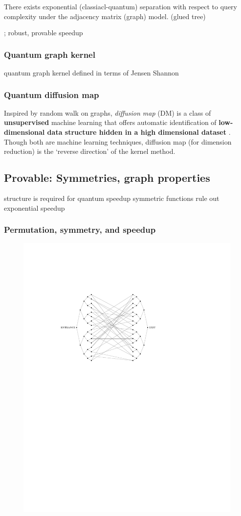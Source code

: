 \begin{theorem}
	There exists exponential (classiacl-quantum) separation with respect to query complexity under the adjacency matrix (graph) model. (glued tree)
\end{theorem}
\cite{zhengSpeedingLearningQuantum2022};
robust, provable speedup
\cite{liuRigorousRobustQuantum2021}

\subsubsection{Quantum graph kernel}
quantum graph kernel defined in terms of Jensen Shannon
\cite{baiQuantumJensenShannon2015}

\subsubsection{Quantum diffusion map}
Inspired by random walk on graphs, \emph{diffusion map} (DM) is a class of \textbf{unsupervised} machine learning that offers automatic identification of \textbf{low-dimensional data structure hidden in a high dimensional dataset} \cite{sornsaengQuantumDiffusionMap2021}.
Though both are machine learning techniques, diffusion map (for dimension reduction) is the `reverse direction' of the kernel method.


\subsection{Provable: Symmetries, graph properties}
structure is required for quantum speedup
\cite{aaronsonNeedStructureQuantum2014}
symmetric functions rule out exponential speedup
\cite{ben-davidSymmetriesGraphProperties2020}

\subsubsection{Permutation, symmetry, and speedup}
\begin{figure}[!ht]
	\centering
	\includegraphics[width=.6\linewidth]{glued_tree.pdf}
	\caption{\cite{childsExponentialAlgorithmicSpeedup2003}}
\end{figure}

